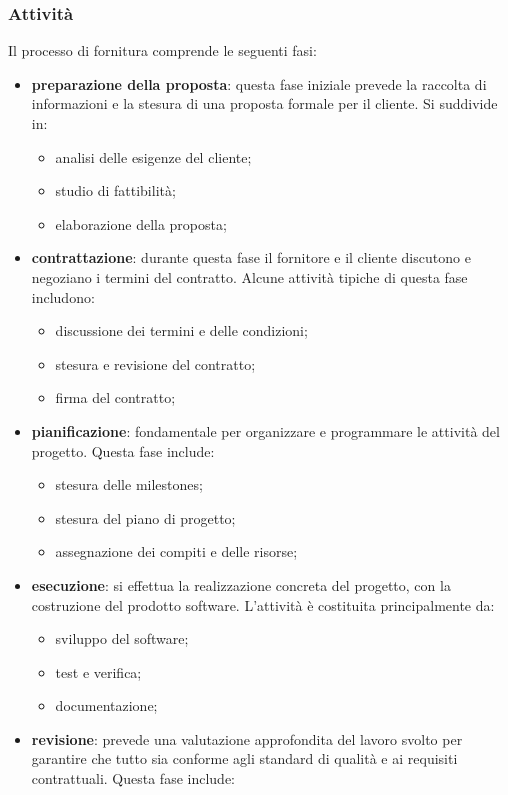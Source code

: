 \subsubsection{Attività}
Il processo di fornitura comprende le seguenti fasi:
\begin{itemize}
	\item \textbf{preparazione della proposta}: questa fase iniziale prevede la raccolta di informazioni e la stesura di una proposta formale per il cliente. Si suddivide in:
		\begin{itemize}
			\item analisi delle esigenze del cliente;
			\item studio di fattibilità;
			\item elaborazione della proposta;
		\end{itemize}
	\item \textbf{contrattazione}: durante questa fase il fornitore e il cliente discutono e negoziano i termini del contratto. Alcune attività tipiche di questa fase includono:
		\begin{itemize}
			\item discussione dei termini e delle condizioni;
			\item stesura e revisione del contratto;
			\item firma del contratto;
		\end{itemize}
	\item \textbf{pianificazione}: fondamentale per organizzare e programmare le attività del progetto. Questa fase include:
		\begin{itemize}
			\item stesura delle milestones;
			\item stesura del piano di progetto;
			\item assegnazione dei compiti e delle risorse;
		\end{itemize}
	\item \textbf{esecuzione}: si effettua la realizzazione concreta del progetto, con la costruzione del prodotto software. L'attività è costituita principalmente da:
		\begin{itemize}
			\item sviluppo del software;
			\item test e verifica;
			\item documentazione;
		\end{itemize}
	\item \textbf{revisione}: prevede una valutazione approfondita del lavoro svolto per garantire che tutto sia conforme agli standard di qualità e ai requisiti contrattuali. Questa fase include:

\end{itemize}

